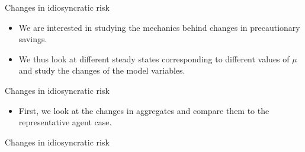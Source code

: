 \documentclass{beamer}
\begin{document}
\begin{frame}{Changes in idiosyncratic risk}
	\begin{itemize}
	
	\item {
	We are interested in studying the mechanics behind changes in precautionary savings. 
	}
	\item {
	We thus look at different steady states corresponding to different values of $\mu$ and study the changes of the model variables.
	}
	
	\end{itemize}
\end{frame}

\begin{frame}{Changes in idiosyncratic risk}
	\begin{itemize}
	
	\item {
	First, we look at the changes in aggregates and compare them to the representative agent case.
	}

	\end{itemize}
\end{frame}

\begin{frame}{Changes in idiosyncratic risk}

\end{frame}
	
\end{document}
